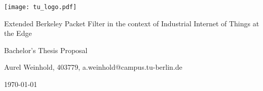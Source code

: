 \documentclass[11pt, a4paper]{scrartcl}
\begin{document}
\begin{title}

    \begin{center}
        \texttt{[image: tu\_logo.pdf]}

        \vspace*{2em}
        \LARGE
        Extended Berkeley Packet Filter in the context of Industrial Internet of
        Things at the Edge

        \vspace*{1em}
        \small
        Bachelor's Thesis Proposal

        \vspace*{1em}
        Aurel Weinhold, 403779, a.weinhold@campus.tu-berlin.de

        \vspace*{1em}
        \today

    \end{center}

\end{title}
\end{document}
